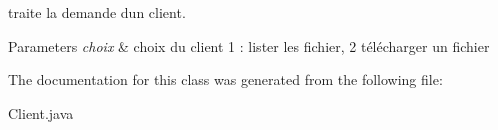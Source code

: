 traite la demande d\textquotesingle{}un client. 


\begin{DoxyParams}{Parameters}
{\em choix} & choix du client 1 \+: lister les fichier, 2 télécharger un fichier \\
\hline
\end{DoxyParams}


The documentation for this class was generated from the following file\+:\begin{DoxyCompactItemize}
\item 
Client.\+java\end{DoxyCompactItemize}
